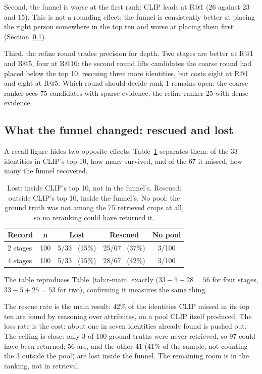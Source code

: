 Second, the funnel is worse at the first rank: CLIP leads at R@1 (26 against 23 and
15). This is not a rounding effect; the funnel is consistently better at placing
the right person somewhere in the top ten and worse at placing them first
(Section~\ref{sec:r-lost}).

Third, the refine round trades precision for depth. Two stages are better at R@1
and R@5, four at R@10: the second round lifts candidates the coarse round had
placed below the top 10, rescuing three more identities, but costs eight at R@1 and
eight at R@5. Which round should decide rank 1 remains open: the coarse ranker sees
75 candidates with sparse evidence, the refine ranker 25 with dense evidence.

\subsection{What the funnel changed: rescued and lost}
\label{sec:r-lost}
A recall figure hides two opposite effects. Table~\ref{tab:r-lost} separates them:
of the 33 identities in CLIP's top 10, how many survived, and of the 67 it missed,
how many the funnel recovered.

\begin{table}[H]
\centering
\begin{tabular}{@{}lcccc@{}}
\toprule
\textbf{Record} & \textbf{n} & \textbf{Lost} & \textbf{Rescued} & \textbf{No pool}\\
\midrule
2 stages & 100 & 5/33 \ (15\%) & 25/67 \ (37\%) & 3/100\\
4 stages & 100 & 5/33 \ (15\%) & 28/67 \ (42\%) & 3/100\\
\bottomrule
\end{tabular}
\caption[Identities rescued and lost by the funnel]{Lost: inside CLIP's top 10, not in the funnel's. Rescued: outside CLIP's
top 10, inside the funnel's. No pool: the ground truth was not among the 75
retrieved crops at all, so no reranking could have returned it.}
\label{tab:r-lost}
\end{table}

The table reproduces Table~\ref{tab:r-main} exactly ($33 - 5 + 28 = 56$ for four
stages, $33 - 5 + 25 = 53$ for two), confirming it measures the same thing.

The rescue rate is the main result: 42\% of the identities CLIP missed in its top
ten are found by reasoning over attributes, on a pool CLIP itself produced. The loss
rate is the cost: about one in seven identities already found is pushed out. The
ceiling is close: only 3 of 100 ground truths were never retrieved, so 97 could
have been returned; 56 are, and the other 41 (41\% of the sample, not counting the
3 outside the pool) are lost inside the funnel. The remaining room is in the
ranking, not in retrieval.

